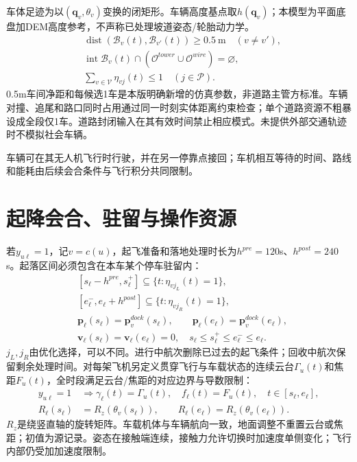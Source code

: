 \noindent 车体足迹为以$(\mathbf q_v,\theta_v)$变换的闭矩形。车辆高度基点取$h(\mathbf q_v)$；本模型为平面底盘加DEM高度参考，不声称已处理坡道姿态/轮胎动力学。
\begin{align}
 &\operatorname{dist}(\mathcal B_v(t),\mathcal B_{v'}(t))\ge0.5\ \mathrm m
                  \quad(v\ne v'),\label{eng:eq:groundcollision}\\
 &\operatorname{int}\mathcal B_v(t)\cap
     (\mathcal O^{tower}\cup\mathcal O^{wire})=\varnothing,\label{eng:eq:groundobstacle}\\
 &\sum_{v\in\mathcal V}\eta_{vj}(t)\le1\quad(j\in\mathcal P).
 \label{eng:eq:parkingcapacity}
\end{align}
\noindent 0.5m车间净距和每候选1车是本版明确新增的仿真参数，非道路主管方标准。车辆对撞、追尾和路口同时占用通过同一时刻实体距离约束检查；单个道路资源不粗暴设成全段仅1车。道路封闭输入在其有效时间禁止相应模式。未提供外部交通轨迹时不模拟社会车辆。

\noindent 车辆可在其无人机飞行时行驶，并在另一停靠点接回；车机相互等待的时间、路线和能耗由后续会合条件与飞行积分共同限制。
\clearpage

\section{起降会合、驻留与操作资源}
\noindent 若$y_{u\ell}=1$，记$v=c(u)$，起飞准备和落地处理时长为$h^{pre}=120$s、$h^{post}=240$s。起落区间必须包含在本车某个停车驻留内：
\begin{align}
 &[s_\ell-h^{pre},s_\ell^+]\subseteq\{t:\eta_{vj_L}(t)=1\},\\
 &[e_\ell^-,e_\ell+h^{post}]\subseteq\{t:\eta_{vj_R}(t)=1\},\\
 &\mathbf p_\ell(s_\ell)=\mathbf p_v^{dock}(s_\ell),\qquad
 \mathbf p_\ell(e_\ell)=\mathbf p_v^{dock}(e_\ell),\\
 &\mathbf v_\ell(s_\ell)=\mathbf v_\ell(e_\ell)=0,\quad
 s_\ell\le s_\ell^+\le e_\ell^-\le e_\ell.
 \label{eng:eq:rendezvous}
\end{align}
\noindent $j_L,j_R$由优化选择，可以不同。进行中航次删除已过去的起飞条件；回收中航次保留剩余处理时间。对每架飞机另定义贯穿飞行与车载状态的连续云台$\Gamma_u(t)$和焦距$F_u(t)$，全时段满足云台/焦距的对应边界与导数限制：
\begin{align}
 y_{u\ell}=1&\Rightarrow \gamma_\ell(t)=\Gamma_u(t),\quad f_\ell(t)=F_u(t),\quad t\in[s_\ell,e_\ell],\\
 R_\ell(s_\ell)&=R_z(\theta_v(s_\ell)),\qquad R_\ell(e_\ell)=R_z(\theta_v(e_\ell)).
 \label{eng:eq:aircraftcontinuity}
\end{align}
\noindent $R_z$是绕竖直轴的旋转矩阵。车载机体与车辆航向一致，地面调整不重置云台或焦距；初值为源记录。姿态在接触端连续，接触力允许切换时加速度单侧变化；飞行内部仍受加加速度限制。

